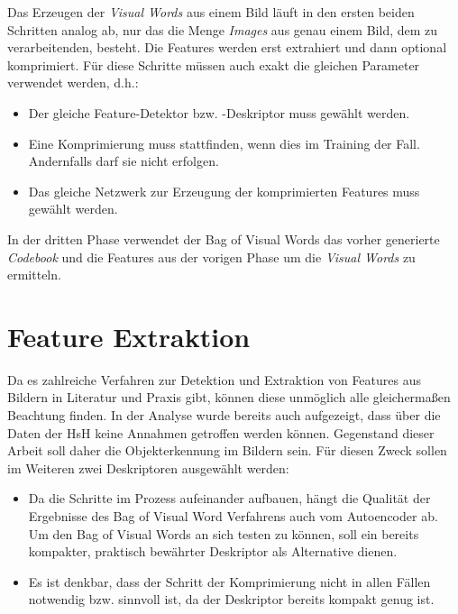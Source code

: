 Das Erzeugen der \textit{Visual Words} aus einem Bild läuft in den ersten beiden Schritten analog ab, nur das die Menge \textit{Images} aus genau einem Bild, dem zu verarbeitenden, besteht. Die Features werden erst extrahiert und dann optional komprimiert. Für diese Schritte müssen auch exakt die gleichen Parameter verwendet werden, d.h.:

\begin{itemize}
	\item Der gleiche Feature-Detektor bzw. -Deskriptor muss gewählt werden.
	\item Eine Komprimierung muss stattfinden, wenn dies im Training der Fall. Andernfalls darf sie nicht erfolgen.
	\item Das gleiche Netzwerk zur Erzeugung der komprimierten Features muss gewählt werden.
\end{itemize}

In der dritten Phase verwendet der Bag of Visual Words das vorher generierte \textit{Codebook} und die Features aus der vorigen Phase um die \textit{Visual Words} zu ermitteln.

\section{Feature Extraktion}

Da es zahlreiche Verfahren zur Detektion und Extraktion von Features aus Bildern in Literatur und Praxis gibt, können diese unmöglich alle gleichermaßen Beachtung finden. In der Analyse wurde bereits auch aufgezeigt, dass über die Daten der HsH keine Annahmen getroffen werden können. Gegenstand dieser Arbeit soll daher die Objekterkennung im Bildern sein. Für diesen Zweck sollen im Weiteren zwei Deskriptoren ausgewählt werden:

\begin{itemize}
	\item Da die Schritte im Prozess aufeinander aufbauen, hängt die Qualität der Ergebnisse des Bag of Visual Word Verfahrens auch vom Autoencoder ab. Um den Bag of Visual Words an sich testen zu können, soll ein bereits kompakter, praktisch bewährter Deskriptor als Alternative dienen.
	\item Es ist denkbar, dass der Schritt der Komprimierung nicht in allen Fällen notwendig bzw. sinnvoll ist, da der Deskriptor bereits kompakt genug ist.
\end{itemize} 

